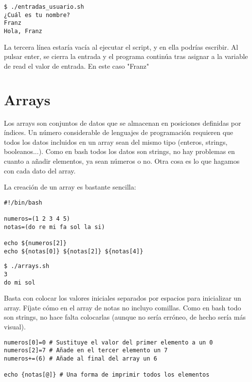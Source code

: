 \begin{tcolorbox-code}
\begin{lstlisting}
$ ./entradas_usuario.sh
¿Cuál es tu nombre?
Franz
Hola, Franz
\end{lstlisting}
\end{tcolorbox-code}

La tercera línea estaría vacía al ejecutar el script, y en ella podrías escribir. Al pulsar enter, se cierra la entrada y el programa continúa tras asignar a la variable de read el valor de entrada. En este caso "Franz"

\section{Arrays}
Los arrays son conjuntos de datos que se almacenan en posiciones definidas por índices. Un número considerable de lenguajes de programación requieren que todos los datos incluidos en un array sean del mismo tipo (enteros, strings, booleanos...). Como en bash todos los datos son strings, no hay problemas en cuanto a añadir elementos, ya sean números o no. Otra cosa es lo que hagamos con cada dato del array.

La creación de un array es bastante sencilla:

\begin{tcolorbox-code}
\begin{lstlisting}
#!/bin/bash

numeros=(1 2 3 4 5)
notas=(do re mi fa sol la si)

echo ${numeros[2]}
echo ${notas[0]} ${notas[2]} ${notas[4]}
\end{lstlisting}
\end{tcolorbox-code}

\begin{tcolorbox-code}
\begin{lstlisting}
$ ./arrays.sh
3
do mi sol
\end{lstlisting}
\end{tcolorbox-code}

Basta con colocar los valores iniciales separados por espacios para inicializar un array. Fíjate cómo en el array de notas no incluyo comillas. Como en bash todo son strings, no hace falta colocarlas (aunque no sería erróneo, de hecho sería más visual).

\begin{tcolorbox-code}
\begin{lstlisting}
numeros[0]=0 # Sustituye el valor del primer elemento a un 0
numeros[2]=7 # Añade en el tercer elemento un 7
numeros+=(6) # Añade al final del array un 6

echo {notas[@]} # Una forma de imprimir todos los elementos
\end{lstlisting}
\end{tcolorbox-code}

